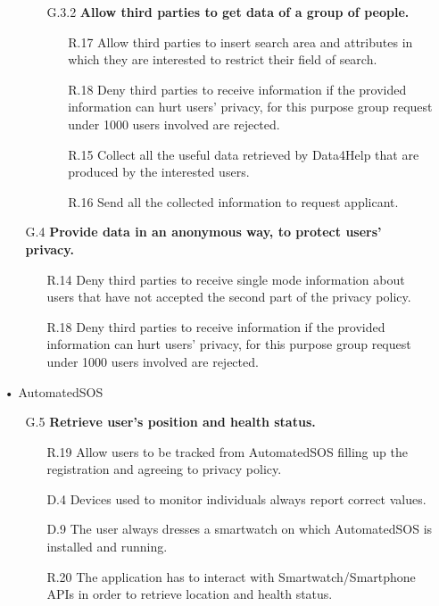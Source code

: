\begin{enumerate}
\begin{enumerate}
\begin{enumerate}
    	\item [G.3.2] \textbf{Allow third parties to get data of a group of people.}
		\begin{enumerate}
    	\item [R.17] Allow third parties to insert search area and attributes in which they are interested to restrict their field of search.
    	\item [R.18] Deny third parties to receive information if the provided information can hurt users' privacy, for this purpose group request under 1000 users involved are rejected.
    	\item [R.15] Collect all the useful data retrieved by Data4Help that are produced by the interested users.
    	\item [R.16] Send all the collected information to request applicant.
    	\end{enumerate}
    	\end{enumerate}
    	
    \item [G.4] \textbf{Provide data in an anonymous way, to protect users' privacy.}
		\begin{enumerate}
    	\item [R.14] Deny third parties to receive single mode information about users that have not accepted the second part of the privacy policy.
    	\item [R.18] Deny third parties to receive information if the provided information can hurt users' privacy, for this purpose group request under 1000 users involved are rejected.
    	\end{enumerate}	
			
	\end{enumerate}
	
	
\item[•]{\Large AutomatedSOS}
	
	\begin{enumerate}
	\item [G.5] \textbf{Retrieve user's position and health status.}
		\begin{enumerate}
		\item [R.19] Allow users to be tracked from AutomatedSOS filling up the registration and agreeing to privacy policy.
		\item [D.4] Devices used to monitor individuals always report correct values.
		\item [D.9] The user always dresses a smartwatch on which AutomatedSOS is installed and running.    
		\item [R.20] The application has to interact with Smartwatch/Smartphone APIs in order to retrieve location and health status.
		\end{enumerate}
	

\end{enumerate}
\end{enumerate}
